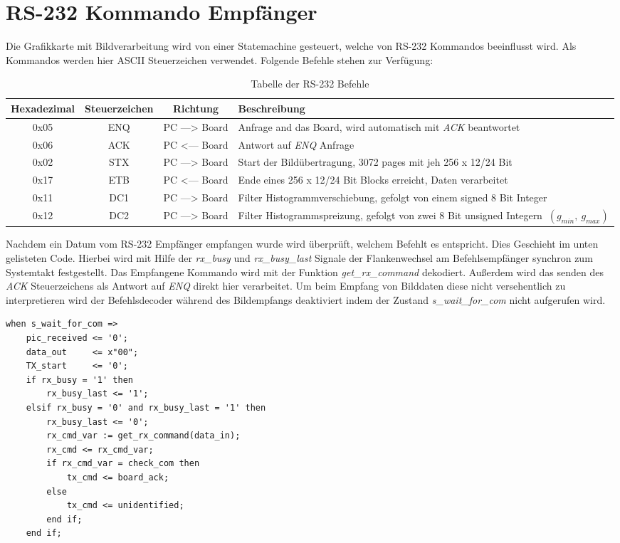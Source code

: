 \documentclass[%
  paper=A4, %
  pagesize, %
  12pt,
  ngerman   %
]{scrreprt}  %
\begin{document}
\chapter{RS-232 Kommando Empfänger}
Die Grafikkarte mit Bildverarbeitung wird von einer Statemachine gesteuert, welche von RS-232 Kommandos beeinflusst wird. Als Kommandos werden hier ASCII Steuerzeichen verwendet. Folgende Befehle stehen zur Verfügung:

\begin{table}[h]
\begin{tabular}{|c|c|c|p{6cm}|}
\hline 
Hexadezimal & Steuerzeichen & Richtung & Beschreibung \\ 
\hline 
0x05 & ENQ & PC ---> Board & Anfrage and das Board, wird automatisch mit \emph{ACK} beantwortet \\ 
\hline 
0x06 & ACK & PC <--- Board & Antwort auf \emph{ENQ} Anfrage \\ 
\hline 
0x02 & STX & PC ---> Board & Start der Bildübertragung, 3072 pages mit jeh 256 x 12/24 Bit \\ 
\hline 
0x17 & ETB & PC <--- Board & Ende eines 256 x 12/24 Bit Blocks erreicht, Daten verarbeitet \\ 
\hline 
0x11 & DC1 & PC ---> Board & Filter Histogrammverschiebung, gefolgt von einem signed 8 Bit Integer \\
\hline 
0x12 & DC2 & PC ---> Board & Filter Histogrammspreizung, gefolgt von zwei 8 Bit unsigned Integern $\ (g_{min},\:g_{max})$\\
\hline
\end{tabular} \linebreak
\caption{Tabelle der RS-232 Befehle}
\label{tab:com}
\end{table}
Nachdem ein Datum vom RS-232 Empfänger empfangen wurde wird überprüft, welchem Befehlt es entspricht. Dies Geschieht im unten gelisteten Code. Hierbei wird mit Hilfe der \emph{rx\_busy} und \emph{rx\_busy\_last} Signale der Flankenwechsel am Befehlsempfänger synchron zum Systemtakt festgestellt. Das Empfangene Kommando wird mit der Funktion \emph{get\_rx\_command} dekodiert. Außerdem wird das senden des \emph{ACK} Steuerzeichens als Antwort auf \emph{ENQ} direkt hier verarbeitet. Um beim Empfang von Bilddaten diese nicht versehentlich zu interpretieren wird der Befehlsdecoder während des Bildempfangs deaktiviert indem der Zustand \emph{s\_wait\_for\_com} nicht aufgerufen wird.

\lstset{numbers = left,
numberstyle =\tiny,
language = VHDL, 
tabsize = 4,
keywordstyle=\color{blue},          %
commentstyle=\color{dkgreen},       %
basicstyle= \footnotesize\ttfamily
}
\begin{lstlisting}
when s_wait_for_com =>
	pic_received <= '0';
	data_out     <= x"00";
	TX_start     <= '0';
	if rx_busy = '1' then
		rx_busy_last <= '1';
	elsif rx_busy = '0' and rx_busy_last = '1' then
		rx_busy_last <= '0';
		rx_cmd_var := get_rx_command(data_in);
		rx_cmd <= rx_cmd_var;
		if rx_cmd_var = check_com then
			tx_cmd <= board_ack;
		else
			tx_cmd <= unidentified;
		end if;
	end if;
\end{lstlisting}
\end{document}
